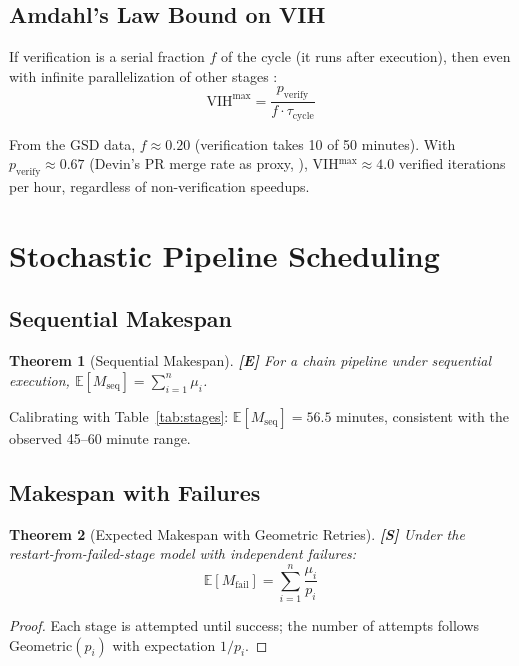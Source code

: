 \documentclass[11pt,a4paper]{article}
\newtheorem{theorem}{Theorem}[section]
\theoremstyle{definition}
\theoremstyle{remark}
\newcommand{\VIH}{\mathrm{VIH}}
\newcommand{\E}{\mathbb{E}}
\begin{document}
\subsection{Amdahl's Law Bound on VIH}

If verification is a serial fraction $f$ of the cycle (it runs after execution), then even with infinite parallelization of other stages \citep{amdahl1967validity}:
\[
    \VIH^{\max} = \frac{p_{\mathrm{verify}}}{f \cdot \tau_{\mathrm{cycle}}}
\]

From the GSD data, $f \approx 0.20$ (verification takes 10 of 50 minutes). With $p_{\mathrm{verify}} \approx 0.67$ (Devin's PR merge rate as proxy, \citealt{cognition2025devin}), VIH$^{\max} \approx 4.0$ verified iterations per hour, regardless of non-verification speedups.


\section{Stochastic Pipeline Scheduling}\label{sec:scheduling}

\subsection{Sequential Makespan}

\begin{theorem}[Sequential Makespan]\label{thm:seq}
\textbf{[E]} For a chain pipeline under sequential execution, $\E[M_{\mathrm{seq}}] = \sum_{i=1}^n \mu_i$.
\end{theorem}

Calibrating with Table~\ref{tab:stages}: $\E[M_{\mathrm{seq}}] = 56.5$ minutes, consistent with the observed 45--60 minute range.

\subsection{Makespan with Failures}

\begin{theorem}[Expected Makespan with Geometric Retries]\label{thm:failures}
\textbf{[S]} Under the restart-from-failed-stage model with independent failures:
\[
    \E[M_{\mathrm{fail}}] = \sum_{i=1}^n \frac{\mu_i}{p_i}
\]
\end{theorem}

\begin{proof}
Each stage is attempted until success; the number of attempts follows $\mathrm{Geometric}(p_i)$ with expectation $1/p_i$.
\end{proof}
\end{document}
